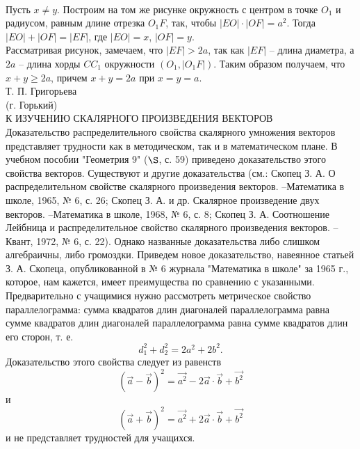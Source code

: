 \documentclass{article}
\begin{document}
\\Пусть $x\neq y$. Построим на том же рисунке окружность с центром в точке $O_1$ и радиусом, равным длине отрезка $O_1F$, так, чтобы $|EO|\cdot|OF|=a^2$. Тогда $|EO|+|OF|=|EF|$, где $|EO|=x$, $|OF|=y$.
\\Рассматривая рисунок, замечаем, что $|EF|>2a$, так как $|EF|$ -- длина диаметра, а $2a$ -- длина хорды $CC_1$ окружности $(O_1,|O_1F|)$. Таким образом получаем, что $x+y\geqslant2a$, причем $x+y=2a$ при $x=y=a$.
\\Т. П. Григорьева
\\(г. Горький)
\\К ИЗУЧЕНИЮ СКАЛЯРНОГО ПРОИЗВЕДЕНИЯ ВЕКТОРОВ
\\Доказательство распределительного свойства скалярного умножения векторов представляет трудности как в методическом, так и в математическом плане. В учебном пособии "Геометрия 9" ($\S$, с. 59) приведено доказательство этого свойства векторов. Существуют и другие доказательства (см.: Скопец З. А. О распределительном свойстве скалярного произведения векторов. --Математика в школе, 1965, № 6, с. 26; Скопец З. А. и др. Скалярное произведение двух векторов. --Математика в школе, 1968, № 6, с. 8; Скопец З. А. Соотношение Лейбница и распределительное свойство скалярного произведения векторов. --Квант, 1972, № 6, с. 22). Однако названные доказательства либо слишком алгебраичны, либо громоздки. Приведем новое доказательство, навеянное статьей З. А. Скопеца, опубликованной в № 6 журнала "Математика в школе" за 1965 г., которое, нам кажется, имеет преимущества по сравнению с указанными.
\\Предварительно с учащимися нужно рассмотреть метрическое свойство параллелограмма: сумма квадратов длин диагоналей параллелограмма равна сумме квадратов длин диагоналей параллелограмма равна сумме квадратов длин его сторон, т. е.
\begin{equation} \label{E1}
d_1^2+d_2^2=2a^2+2b^2.
\end{equation}
Доказательство этого свойства следует из равенств
\begin{equation} \label{E2}
(\overrightarrow{a}-\overrightarrow{b})^2=\overrightarrow{a^2}-2\overrightarrow{a}\cdot\overrightarrow{b}+\overrightarrow{b^2}
\end{equation}
и
\begin{equation} \label{E3}
(\overrightarrow{a}+\overrightarrow{b})^2=\overrightarrow{a^2}+2\overrightarrow{a}\cdot\overrightarrow{b}+\overrightarrow{b^2}
\end{equation}
и не представляет трудностей для учащихся.
\end{document}
